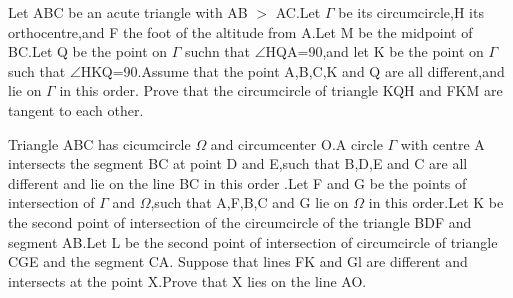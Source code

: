 \item Let ABC be an acute triangle with AB $>$ AC.Let $\Gamma$ be its circumcircle,H its orthocentre,and F the foot of the altitude from A.Let M be the midpoint of BC.Let Q be the point on $\Gamma$ suchn that $\angle$HQA=90,and let K be the point on $\Gamma$ such that $\angle$HKQ=90.Assume that the point A,B,C,K and Q are all different,and lie on $\Gamma$ in this order.
Prove that the circumcircle of triangle KQH and FKM are tangent to each other.

\item Triangle ABC has cicumcircle $\Omega$ and circumcenter O.A circle $\Gamma$ with centre A intersects the segment BC at point D and E,such that B,D,E and C are all different and lie on the line BC in this order .Let F and G be the points of intersection of $\Gamma$ and $\Omega$,such that A,F,B,C and G lie on $\Omega$ in this order.Let K be the second point of intersection of the circumcircle of the triangle BDF and segment AB.Let L be the second point of intersection of circumcircle of triangle CGE and the segment CA.
Suppose that lines FK and Gl are different and intersects at the point X.Prove that X lies on the line AO.
